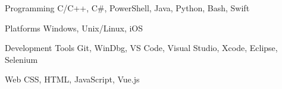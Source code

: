 
\begin{cvskills}

  \cvskill
    {Programming} %
    {C/C++, C\#, PowerShell, Java, Python, Bash, Swift} %

  \cvskill
    {Platforms} %
    {Windows, Unix/Linux, iOS} %

  \cvskill
    {Development Tools} %
    {Git, WinDbg, VS Code, Visual Studio, Xcode, Eclipse, Selenium} %

  \cvskill
    {Web} %
    {CSS, HTML, JavaScript, Vue.js} %

\end{cvskills}

